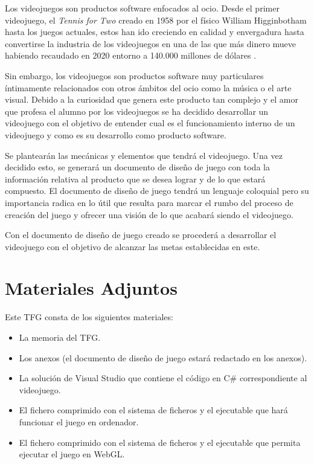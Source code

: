 
Los videojuegos son productos software enfocados al ocio. Desde el primer videojuego, el \textit{Tennis for Two \cite{Tennis4two}} creado en 1958 por el físico William Higginbotham hasta los juegos actuales, estos han ido creciendo en calidad y envergadura hasta convertirse la industria de los videojuegos en una de las que más dinero mueve habiendo recaudado en 2020 entorno a 140.000 millones de dólares \cite{2020GamesMoney}.

Sin embargo, los videojuegos son productos software muy particulares íntimamente relacionados con otros ámbitos del ocio como la música o el arte visual. Debido a la curiosidad que genera este producto tan complejo y el amor que profesa el alumno por los videojuegos se ha decidido desarrollar un videojuego con el objetivo de entender cual es el funcionamiento interno de un videojuego y como es su desarrollo como producto software.

Se plantearán las mecánicas y elementos que tendrá el videojuego. Una vez decidido esto, se generará un documento de diseño de juego con toda la información relativa al producto que se desea lograr y de lo que estará compuesto. El documento de diseño de juego tendrá un lenguaje coloquial pero su importancia radica en lo útil que resulta para marcar el rumbo del proceso de creación del juego y ofrecer una visión de lo que acabará siendo el videojuego.

Con el documento de diseño de juego creado se procederá a desarrollar el videojuego con el objetivo de alcanzar las metas establecidas en este.

\section{Materiales Adjuntos}
Este TFG consta de los siguientes materiales:
\begin{itemize}
\item
La memoria del TFG.
\item
Los anexos (el documento de diseño de juego estará redactado en los anexos).
\item
La solución de Visual Studio que contiene el código en C\# correspondiente al videojuego.
\item
El fichero comprimido con el sistema de ficheros y el ejecutable que hará funcionar el juego en ordenador.
\item
El fichero comprimido con el sistema de ficheros y el ejecutable que permita ejecutar el juego en WebGL.
\end{itemize}

